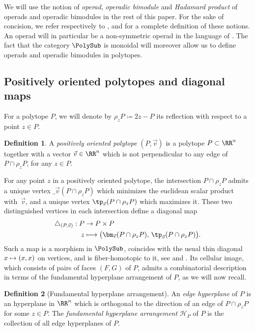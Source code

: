\documentclass[JEP,XML,SOM,NoFloatCountersInSection,Unicode,published]{cedram}
\def\mto{\mathchoice{\longmapsto}{\mapsto}{\mapsto}{\mapsto}}
\theoremstyle{definition}
\newtheorem{definition}{Definition}[section]
\theoremstyle{plain}
\begin{document}
We will use the notion of \textit{operad}, \textit{operadic bimodule} and \textit{Hadamard product} of operads and operadic bimodules in the rest of this paper. For the sake of concision, we refer respectively to \cite[\S 1.1.1]{mazuir-I}, \cite[\S 1.1.3]{mazuir-I} and \cite[\S 5.1.12]{LodayVallette12} for a complete definition of these notions. An operad will in particular be a non-symmetric operad in the language of \cite[\S 5.2.8]{LodayVallette12}. The fact that the category $\PolySub$ is monoidal will moreover allow us to define operads and operadic bimodules in polytopes.

\subsection{Positively oriented polytopes and diagonal maps}

For a polytope $P$, we will denote by $\rho_z P \coloneqq 2z-P$ its reflection with respect to a point $z \in P$.

\begin{definition}
A \emph{positively oriented polytope} $(P, \vec v)$ is a polytope $P \subset \RR^n$ together with a vector $\vec v\in \RR^n$ which is not perpendicular to any edge of $P\cap \rho_z P$, for any $z \in P$.
\end{definition}

For any point $z$ in a positively oriented polytope, the intersection $P \cap \rho_z P$ admits a unique vertex $\bm_{\vec v}(P \cap \rho_z P)$ which minimizes the euclidean scalar product with~$\vec v$, and a unique vertex $\tp_{\vec v}(P \cap \rho_z P)$ which maximizes it. These two distinguished vertices in each intersection define a diagonal map
\begin{align*}
\triangle_{(P,\vec v)}: P &\to P \times P\\
z & \mto
\bigl(\bm_{\vec v}(P\cap \rho_zP),\, \tp_{\vec v}(P\cap \rho_z P)\bigr).
\end{align*}
Such a map is a morphism in $\PolySub$, coincides with the usual thin diagonal $x\mto (x, x)$ on vertices, and is fiber-homotopic to it, see \cite[Prop.\,5]{MTTV19} and \cite[Prop.\,1.1]{LA21}.
Its cellular image, which consists of pairs of faces $(F,G)$ of $P$, admits a combinatorial description in terms of the fundamental hyperplane arrangement of $P$, as we will now recall.

\begin{definition}[Fundamental hyperplane arrangement]
\label{def:fundamentalhyperplane}
An \emph{edge hyperplane} of $P$ is an hyperplane in $\RR^n$ which is orthogonal to the direction of an edge of $P\cap\rho_z P$ for some $z \in P$.
The \emph{fundamental hyperplane arrangement} $\mathcal{H}_P$ of $P$ is the collection of all edge hyperplanes of $P$.
\end{definition}
\end{document}
